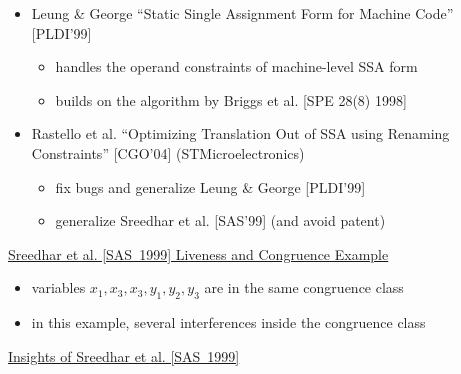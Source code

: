 \begin{itemize}
\item Leung \& George ``Static Single Assignment Form for Machine Code'' [PLDI'99]

\begin{itemize}
\item handles the operand constraints of machine-level SSA form
\item builds on the algorithm by Briggs et al. [SPE 28(8) 1998]
\end{itemize}

\item Rastello et al. ``Optimizing Translation Out of SSA using Renaming
Constraints'' [CGO'04] (STMicroelectronics)
\begin{itemize}
\item fix bugs and generalize Leung \& George [PLDI'99]
\item generalize Sreedhar et al. [SAS'99] (and avoid patent)
\end{itemize}

\end{itemize}


\begin{center} \underline{Sreedhar et al. [SAS~1999] Liveness and Congruence Example}
\end{center}



\begin{itemize}

\item variables ${x_1, x_3, x_3, y_1, y_2, y_3}$ are in the same congruence class

\item in this example, several interferences inside the congruence class

\end{itemize}


\begin{center} \underline{Insights of Sreedhar et al. [SAS~1999]}
\end{center}

